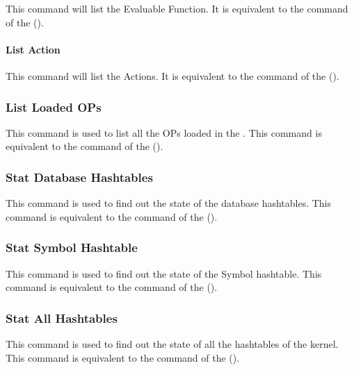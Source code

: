 This command will list the Evaluable Function. It is equivalent to the
 command of the \CPK{} (). 

\paragraph{List Action}

This command will list the Actions. It is equivalent to the 
command of the \CPK{} ().

\subsubsection{List Loaded OPs}

This command is used to list all the OPs loaded
in the \XPK{}. This command is equivalent to the  command
of the \CPK{} ().

\subsubsection{Stat Database Hashtables}

This command is used to find out the state of the database hashtables.
This command is equivalent to the 
command of the \CPK{} ().

\subsubsection{Stat Symbol Hashtable}

This command is used to find out the state of the Symbol hashtable.
This command is equivalent to the 
command of the \CPK{} ().

\subsubsection{Stat All Hashtables}

This command is used to find out the state of all the hashtables of the
kernel.  This command is equivalent to the  command of the
\CPK{} ().

